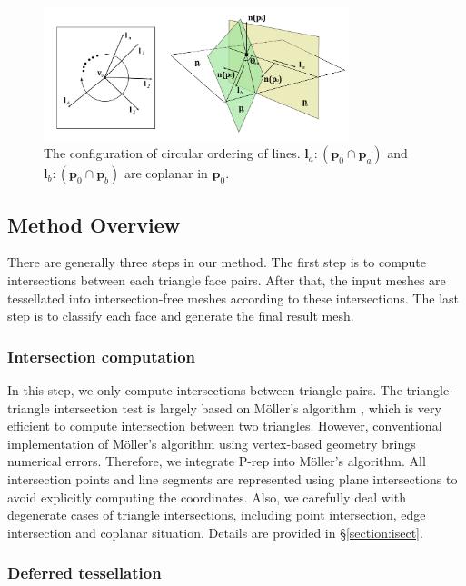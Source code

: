\documentclass[10pt,journal,compsoc]{IEEEtran}
\begin{document}
\begin{figure}[t]
\centering
\includegraphics[width=3.5in]{circularorder}
\caption{The configuration of circular ordering of lines. $\bm{l}_a\colon(\bm{p}_0 \cap \bm{p}_a)$ and $\bm{l}_b\colon(\bm{p}_0 \cap \bm{p}_b)$ are coplanar in $\bm{p}_0$.}
\label{fig:circularorder}
\end{figure}


\subsection{Method Overview}


There are generally three steps in our method. The first step is to compute intersections between each triangle face pairs. After that, the input meshes are tessellated into intersection-free meshes according to these intersections. The last step is to classify each face and generate the final result mesh.

\subsubsection{Intersection computation}

In this step, we only compute intersections between triangle pairs. The triangle-triangle intersection test is largely based on M\"{o}ller's algorithm \cite{moller1997fast}, which is very efficient to compute intersection between two triangles. However, conventional implementation of M\"{o}ller's algorithm using vertex-based geometry brings numerical errors. Therefore, we integrate P-rep into M\"{o}ller's algorithm. All intersection points and line segments are represented using plane intersections to avoid explicitly computing the coordinates. Also, we carefully deal with degenerate cases of triangle intersections, including point intersection, edge intersection and coplanar situation. Details are provided in \S\ref{section:isect}.

\subsubsection{Deferred tessellation}
\end{document}
